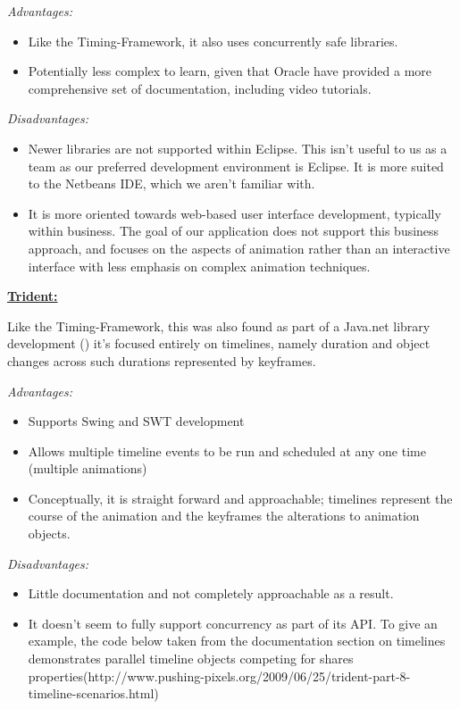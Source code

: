 \documentclass{l3proj}
\begin{document}
\textit{Advantages:}
\begin{itemize}
	\item Like the Timing-Framework, it also uses concurrently safe libraries.
	\item Potentially less complex to learn, given that Oracle have provided a more comprehensive set of documentation, including video tutorials.
\end{itemize}

\textit{Disadvantages:}
\begin{itemize}
	\item Newer libraries are not supported within Eclipse. This isn’t useful to us as a team as our preferred development environment is Eclipse. It is more suited to the Netbeans IDE, which we aren’t familiar with.
	\item It is more oriented towards web-based user interface development, typically within business. The goal of our application does not support this business approach, and focuses on the aspects of animation rather than an interactive interface with less emphasis on complex animation techniques.
\end{itemize}

\underline{\textbf{Trident:}}

Like the Timing-Framework, this was also found as part of a Java.net library development (\cite{website:Trident}) it’s focused entirely on timelines, namely duration and object changes across such durations represented by keyframes.

\textit{Advantages:}
\begin{itemize}
	\item Supports Swing and SWT development
	\item Allows multiple timeline events to be run and scheduled at any one time (multiple animations)
	\item Conceptually, it is straight forward and approachable; timelines represent the course of the animation and the keyframes the alterations to animation objects.
\end{itemize}

\textit{Disadvantages:}
\begin{itemize}
	\item Little documentation and not completely approachable as a result.
	\item It doesn’t seem to fully support concurrency as part of its API. To give an example, the code below taken from the documentation section on timelines demonstrates parallel timeline objects competing for shares properties(http://www.pushing-pixels.org/2009/06/25/trident-part-8-timeline-scenarios.html)
\end{itemize}
\end{document}

